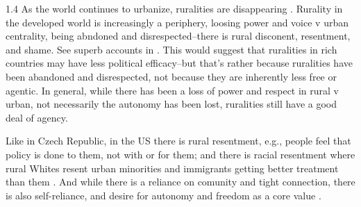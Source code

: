 \documentclass[10pt, letterpaper]{article}
\begin{document}
\begin{spacing}{1.4}
As the world continues to urbanize, ruralities are disappearing 
 \citep{pospvech2024loss}. Rurality in
 the developed world is increasingly a periphery, loosing power and voice v
 urban centrality, being abndoned and disrespected--there is rural disconent,
 resentment, and shame. See superb accounts in 
 \citet{hansonCityJournalautumn15,fullerNYT17monD}. This would suggest that
 ruralities in rich countries may have less political efficacy--but that's rather
 because ruralities have been abandoned and disrespected, not because they are
 inherently less free or agentic. 
 In general, while there has been a loss of power and respect in rural v urban, not
 necessarily the autonomy has been lost, ruralities still have a good deal of agency. 

 Like in Czech Republic, in the US there is rural resentment, e.g., people feel that
 policy is done to them, not with or for them; and there is racial resentment
 where rural Whites resent urban minorities 
 and immigrants getting better treatment than them \citep{diamond23}. %
 And while there is a reliance on comunity and tight connection, there is also
 self-reliance, and desire for autonomy and freedom as a core value
 \citep{diamond23}.



\end{spacing}
\end{document}
